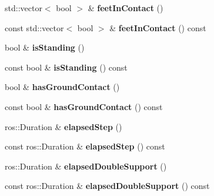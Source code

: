 \begin{DoxyCompactItemize}
\item 
std\+::vector$<$ bool $>$ \& {\bfseries feet\+In\+Contact} ()\hypertarget{classow__core_1_1Flags_a1b3b8f7ffab1c67e41eeb7214b5505a3}{}\label{classow__core_1_1Flags_a1b3b8f7ffab1c67e41eeb7214b5505a3}

\item 
const std\+::vector$<$ bool $>$ \& {\bfseries feet\+In\+Contact} () const \hypertarget{classow__core_1_1Flags_ae68fc11d4fef5bfe95a30d1132be9753}{}\label{classow__core_1_1Flags_ae68fc11d4fef5bfe95a30d1132be9753}

\item 
bool \& {\bfseries is\+Standing} ()\hypertarget{classow__core_1_1Flags_accd2f8f3d5b8bd94985ab06880c6aae4}{}\label{classow__core_1_1Flags_accd2f8f3d5b8bd94985ab06880c6aae4}

\item 
const bool \& {\bfseries is\+Standing} () const \hypertarget{classow__core_1_1Flags_a0c066642adb7d842fcb056b1682c1705}{}\label{classow__core_1_1Flags_a0c066642adb7d842fcb056b1682c1705}

\item 
bool \& {\bfseries has\+Ground\+Contact} ()\hypertarget{classow__core_1_1Flags_a4bf0182674265a6dc6213e29431cf1ce}{}\label{classow__core_1_1Flags_a4bf0182674265a6dc6213e29431cf1ce}

\item 
const bool \& {\bfseries has\+Ground\+Contact} () const \hypertarget{classow__core_1_1Flags_ace4a44e779de4a7f6784abfbc8557972}{}\label{classow__core_1_1Flags_ace4a44e779de4a7f6784abfbc8557972}

\item 
ros\+::\+Duration \& {\bfseries elapsed\+Step} ()\hypertarget{classow__core_1_1Flags_ac9eb44246a055791678c1cde5c3224af}{}\label{classow__core_1_1Flags_ac9eb44246a055791678c1cde5c3224af}

\item 
const ros\+::\+Duration \& {\bfseries elapsed\+Step} () const \hypertarget{classow__core_1_1Flags_a555cea59694da522244671d4353637f7}{}\label{classow__core_1_1Flags_a555cea59694da522244671d4353637f7}

\item 
ros\+::\+Duration \& {\bfseries elapsed\+Double\+Support} ()\hypertarget{classow__core_1_1Flags_a27ee5a80f7e6e06f8bb57f5ca666697e}{}\label{classow__core_1_1Flags_a27ee5a80f7e6e06f8bb57f5ca666697e}

\item 
const ros\+::\+Duration \& {\bfseries elapsed\+Double\+Support} () const \hypertarget{classow__core_1_1Flags_a5e2877775af45bc72740482bdc51dca8}{}\label{classow__core_1_1Flags_a5e2877775af45bc72740482bdc51dca8}


\end{DoxyCompactItemize}
